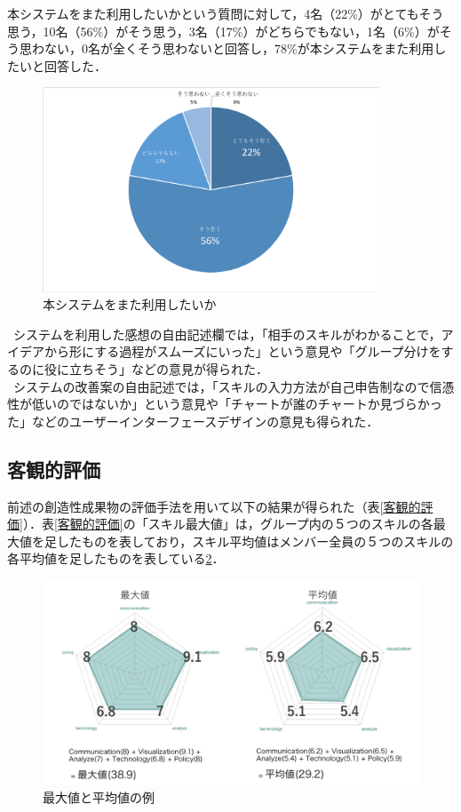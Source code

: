 \documentclass{funthesis}
\begin{document}
本システムをまた利用したいかという質問に対して，4名（22\%）がとてもそう思う，10名（56\%）がそう思う，3名（17\%）がどちらでもない，1名（6\%）がそう思わない，0名が全くそう思わないと回答し，78\%が本システムをまた利用したいと回答した．
\begin{figure}[H]
 \centering
   \includegraphics[width=100mm]{honban1.png}
 \caption{本システムをまた利用したいか}
 \label{testtest}
\end{figure}

\ システムを利用した感想の自由記述欄では，「相手のスキルがわかることで，アイデアから形にする過程がスムーズにいった」という意見や「グループ分けをするのに役に立ちそう」などの意見が得られた．\\
\ システムの改善案の自由記述では，「スキルの入力方法が自己申告制なので信憑性が低いのではないか」という意見や「チャートが誰のチャートか見づらかった」などのユーザーインターフェースデザインの意見も得られた．

\subsection{客観的評価}
前述の創造性成果物の評価手法を用いて以下の結果が得られた（表\ref{客観的評価}）．表\ref{客観的評価}の「スキル最大値」は，グループ内の５つのスキルの各最大値を足したものを表しており，スキル平均値はメンバー全員の５つのスキルの各平均値を足したものを表している\ref{ex}．\\
\begin{figure}[H]
 \centering
   \includegraphics[width=120mm]{figures/extest.png}
 \caption{最大値と平均値の例}
 \label{ex}
\end{figure}
\end{document}

